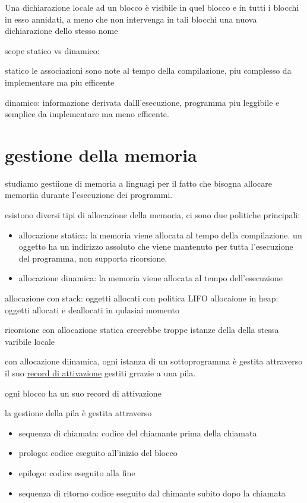 \documentclass[12pt]{article}
\begin{document}
Una dichiarazione locale ad un blocco è visibile in quel
blocco e in tutti i blocchi in esso annidati, a meno che non
intervenga in tali blocchi una nuova dichiarazione dello
stesso nome

scope statico vs dinamico:

statico le associazioni sono note al tempo della compilazione, piu complesso da implementare ma piu efficente

dinamico: informazione derivata dalll'esecuzione, programma piu leggibile e semplice da implementare ma meno efficente.

\section{gestione della memoria}

studiamo gestiione di memoria a linguagi per il fatto che bisogna allocare memoriia durante l'esecuzione dei programmi.

esistono diversi tipi di allocazione della memoria, ci sono due politiche principali:

\begin{itemize}
\item allocazione statica: la memoria viene allocata al tempo della compilazione. un oggetto ha un indirizzo assoluto che viene mantenuto per tutta l'esecuzione del programma, non supporta ricorsione.
\item allocazione dinamica: la memoria viene allocata al tempo dell'esecuzione 
\end{itemize} 
allocazione con stack: oggetti allocati con politica LIFO
 allocaione in heap: oggetti allocati e deallocati in qulasiai momento



ricorsione con allocazione statica creerebbe troppe istanze della della stessa varibile  locale

con allocazione diinamica, ogni istanza di un sottoprogramma è gestita attraverso il suo \underline{record di attivazione} gestiti grrazie a una pila.

ogni blocco ha un suo record di attivazione

la gestione della pila è gestita attraverso 
\begin{itemize}
\item sequenza di chiamata: codice del chiamante prima della chiamata
\item prologo: codice eseguito all'inizio del blocco
\item epilogo: codice eseguito alla fine
\item sequenza di ritorno codice eseguito dal chimante subito dopo la chiamata
\end{itemize}
\end{document}
